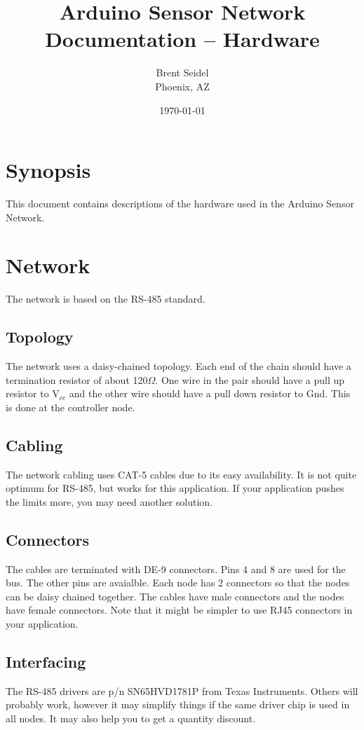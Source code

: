\documentclass[10pt, openany, draft]{article}
\title{Arduino Sensor Network Documentation -- Hardware}
\author{Brent Seidel \\ Phoenix, AZ}
\date{ \today }
\begin{document}
\maketitle

\section{Synopsis}
This document contains descriptions of the hardware used in the Arduino Sensor Network.

\section{Network}
The network is based on the RS-485 standard.

\subsection{Topology}
The network uses a daisy-chained topology.  Each end of the chain should have a termination resistor of about 120$\Omega$.  One wire in the pair should have a pull up resistor to V$_{cc}$ and the other wire should have a pull down resistor to Gnd.  This is done at the controller node.

\subsection{Cabling}
The network cabling uses CAT-5 cables due to its easy availability.  It is not quite optimum for RS-485, but works for this application.  If your application pushes the limits more, you may need another solution.

\subsection{Connectors}
The cables are terminated with DE-9 connectors.  Pins 4 and 8 are used for the bus.  The other pins are avaialble.  Each node has 2 connectors so that the nodes can be daisy chained together.  The cables have male connectors and the nodes have female connectors.  Note that it might be simpler to use RJ45 connectors in your application.

\subsection{Interfacing}
The RS-485 drivers are p/n SN65HVD1781P from Texas Instruments.  Others will probably work, however it may simplify things if the same driver chip is used in all nodes.  It may also help you to get a quantity discount.
\end{document}
